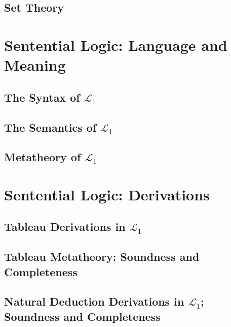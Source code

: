\documentclass[openany,leqno,10pt]{book}
\theoremstyle{break}
\theoremstyle{definition}
\theoremstyle{remark}
\begin{document}
	\newpage
	\chapter{Set Theory}\label{c:sets} %
	 
		\newpage

\part{Sentential Logic: Language and Meaning} \label{p:l1}

\chapter{The Syntax of \texorpdfstring{$\mathcal{L}_{1}$}{L1}}\label{c:l1syntax} %
	
\newpage

\chapter{The Semantics of \texorpdfstring{$\mathcal{L}_{1}$}{L1}}\label{c:l1semantics} %
  
\newpage

\chapter{Metatheory of \texorpdfstring{$\mathcal{L}_{1}$}{L1}}\label{c:l1meta} %
 

\part{Sentential Logic: Derivations} \label{p:l1deriv}

\chapter[Tableau Derivations in \texorpdfstring{$\mathcal{L}_{1}$}{L1}]{Tableau Derivations in \texorpdfstring{$\mathcal{L}_{1}$}{L1}}\label{c:l1tabl} %
  

\chapter[Tableau Metatheory]{Tableau Metatheory: Soundness and Completeness}\label{c:tablmeta} %
  

\chapter[Natural Deduction in \texorpdfstring{$\mathcal{L}_{1}$}{L1}]{Natural Deduction Derivations in \texorpdfstring{$\mathcal{L}_{1}$}{L1}; Soundness and Completeness}\label{c:l1nd} %
  
\end{document}
